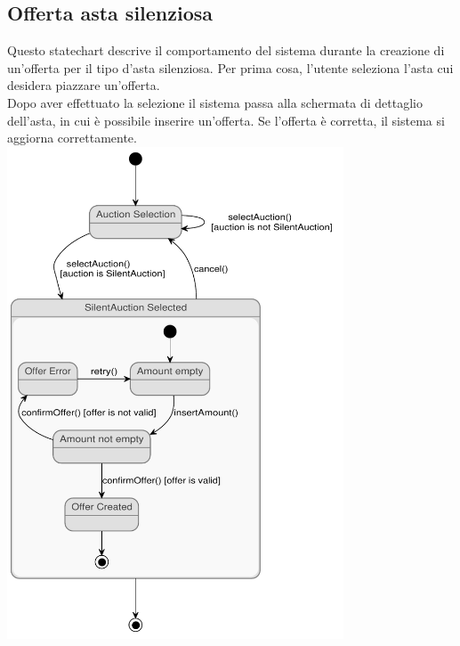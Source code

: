 \subsection{Offerta asta silenziosa}
\begin{center}
Questo statechart descrive il comportamento del sistema durante la creazione di un'offerta per il tipo d'asta silenziosa.
Per prima cosa, l'utente seleziona l'asta cui desidera piazzare un'offerta. 
\\ Dopo aver effettuato la selezione il sistema passa alla schermata di dettaglio dell'asta, in cui è possibile inserire un'offerta.
Se l'offerta è corretta, il sistema si aggiorna correttamente.
\\ 
\includegraphics[width=0.75\textwidth]{assets/state_charts/offerta_asta_silenziosa.pdf}
\end{center}
\newpage

